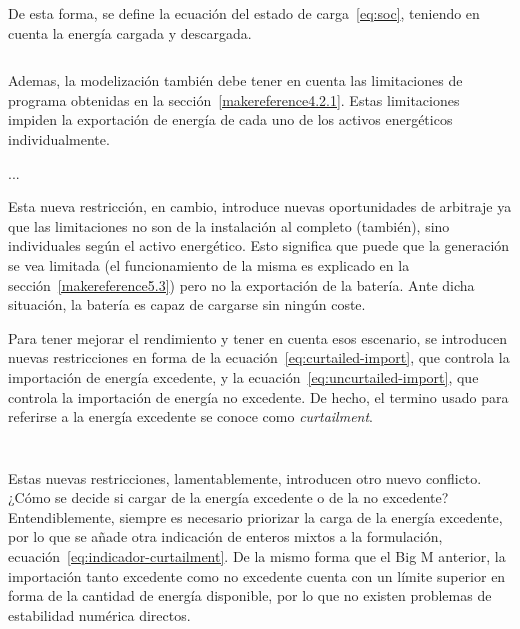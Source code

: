 \begin{equation}
  \label{eq:soc-final}
\end{equation}

De esta forma, se define la ecuación del estado de carga~\ref{eq:soc}, teniendo en cuenta la energía cargada y descargada.

\begin{equation}
  \label{eq:soc}
\end{equation}

Ademas, la modelización también debe tener en cuenta las limitaciones de programa obtenidas en la sección~\ref{makereference4.2.1}. Estas limitaciones impiden la exportación de energía de cada uno de los activos energéticos individualmente.

...

Esta nueva restricción, en cambio, introduce nuevas oportunidades de arbitraje ya que las limitaciones no son de la instalación al completo (también), sino individuales según el activo energético. Esto significa que puede que la generación se vea limitada (el funcionamiento de la misma es explicado en la sección~\ref{makereference5.3}) pero no la exportación de la batería. Ante dicha situación, la batería es capaz de cargarse sin ningún coste.

Para tener mejorar el rendimiento y tener en cuenta esos escenario, se introducen nuevas restricciones en forma de la ecuación~\ref{eq:curtailed-import}, que controla la importación de energía excedente, y la ecuación~\ref{eq:uncurtailed-import}, que controla la importación de energía no excedente. De hecho, el termino usado para referirse a la energía excedente se conoce como \textit{curtailment}.

\begin{equation}
  \label{eq:curtailed-import}
\end{equation}

\begin{equation}
  \label{eq:uncurtailed-import}
\end{equation}

Estas nuevas restricciones, lamentablemente, introducen otro nuevo conflicto. ¿Cómo se decide si cargar de la energía excedente o de la no excedente? Entendiblemente, siempre es necesario priorizar la carga de la energía excedente, por lo que se añade otra indicación de enteros mixtos a la formulación, ecuación~\ref{eq:indicador-curtailment}. De la mismo forma que el Big M anterior, la importación tanto excedente como no excedente cuenta con un límite superior en forma de la cantidad de energía disponible, por lo que no existen problemas de estabilidad numérica directos.

